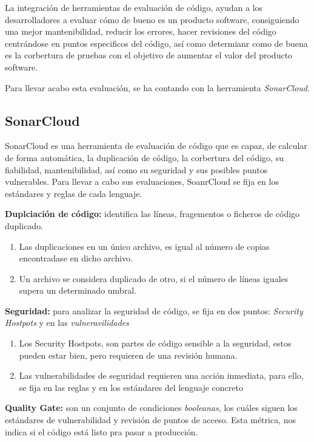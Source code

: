 La integración de herramientas de evaluación de código, ayudan a los desarrolladores a evaluar cómo de bueno es un producto software, consiguiendo una mejor mantenibilidad, reducir los errores, hacer revisiones del código centrándose en puntos especificos del código, así como determianr como de buena es la corbertura de pruebas con el objetivo de aumentar el valor del producto software.

Para llevar acabo esta evaluación, se ha contando con la herramienta \textit{SonarCloud}. 

\subsection*{SonarCloud}

SonarCloud\cite{sonar_cloud} es una herramienta de evaluación de código que es capaz, de calcular de forma automática, la duplicación de código, la corbertura del código, su fiabilidad, mantenibilidad, así como su seguridad y sus posibles puntos vulnerables.
Para llevar a cabo sus evaluaciones, SoanrCloud se fija en los estándares y reglas de cada lenguaje.

\begin{list}{\textbullet}{ %
    \addtolength{\itemsep}{-2mm} %
    \setlength{\itemindent}{2mm}}

    \item \textbf{Duplciación de código:} identifica las líneas, fragementos o ficheros de código duplicado.
    \begin{enumerate}
        \item Las duplicaciones en un único archivo, es igual al número de copias encontradase en dicho archivo.
        \item Un archivo se considera duplicado de otro, si el número de líneas iguales supera un determinado umbral.
    \end{enumerate}
    \item \textbf{Seguridad:} para analizar la seguridad de código, se fija en dos puntos: \textit{Security Hostpots} y en las \textit{vulneravilidades}
    \begin{enumerate}
        \item Los Security Hostpots, son partes de código sensible a la seguridad, estos pueden estar bien, pero requieren de una revisión humana.
        \item Las vulnerabilidades de seguridad requieren una acción inmediata, para ello, se fija en las reglas  y en los estándares del lenguaje concreto
    \end{enumerate}
    \item \textbf{Quality Gate:} son un conjunto de condiciones \textit{booleanas}, los cuáles siguen los estándares de vulnerabilidad y revisión de puntos de acceso. Esta métrica, nos indica si el código está listo pra pasar a producción.
\end{list}